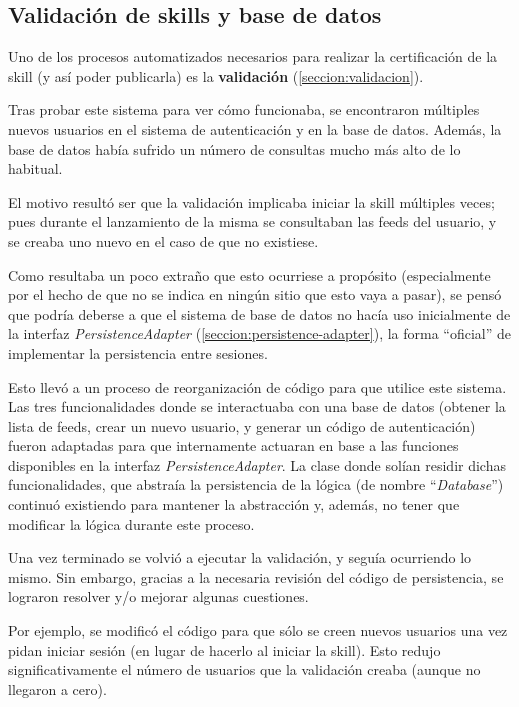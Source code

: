 \documentclass[11pt,spanish,listoffigures,listoftables,table,hyphens,dvipsnames]{tfgetsinf}
\begin{document}
\subsection{Validación de skills y base de datos}
\label{seccion:validacion-bd}

Uno de los procesos automatizados necesarios para realizar la certificación de la skill (y así poder publicarla) es la \textbf{validación} (\ref{seccion:validacion}).

Tras probar este sistema para ver cómo funcionaba, se encontraron múltiples nuevos usuarios en el sistema de autenticación y en la base de datos. Además, la base de datos había sufrido un número de consultas mucho más alto de lo habitual.

El motivo resultó ser que la validación implicaba iniciar la skill múltiples veces; pues durante el lanzamiento de la misma se consultaban las feeds del usuario, y se creaba uno nuevo en el caso de que no existiese.

Como resultaba un poco extraño que esto ocurriese a propósito (especialmente por el hecho de que no se indica en ningún sitio que esto vaya a pasar), se pensó que podría deberse a que el sistema de base de datos no hacía uso inicialmente de la interfaz \emph{PersistenceAdapter} (\ref{seccion:persistence-adapter}), la forma ``oficial'' de implementar la persistencia entre sesiones.

Esto llevó a un proceso de reorganización de código para que utilice este sistema. Las tres funcionalidades donde se interactuaba con una base de datos (obtener la lista de feeds, crear un nuevo usuario, y generar un código de autenticación) fueron adaptadas para que internamente actuaran en base a las funciones disponibles en la interfaz \emph{PersistenceAdapter}. La clase donde solían residir dichas funcionalidades, que abstraía la persistencia de la lógica (de nombre ``\emph{Database}'') continuó existiendo para mantener la abstracción y, además, no tener que modificar la lógica durante este proceso.

Una vez terminado se volvió a ejecutar la validación, y seguía ocurriendo lo mismo. Sin embargo, gracias a la necesaria revisión del código de persistencia, se lograron resolver y/o mejorar algunas cuestiones.

Por ejemplo, se modificó el código para que sólo se creen nuevos usuarios una vez pidan iniciar sesión (en lugar de hacerlo al iniciar la skill). Esto redujo significativamente el número de usuarios que la validación creaba (aunque no llegaron a cero).
\end{document}
